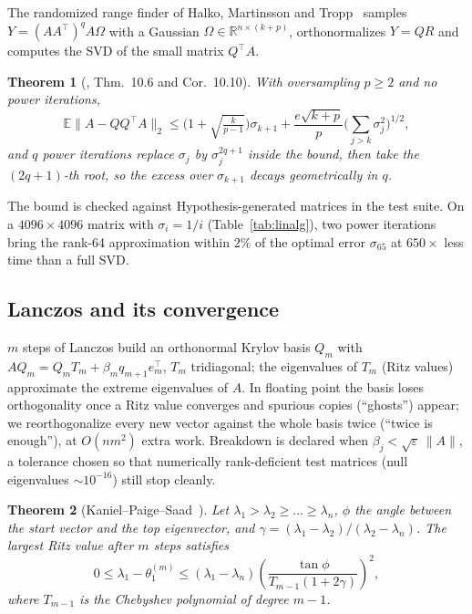 \documentclass[11pt]{article}
\newtheorem{theorem}{Theorem}
\theoremstyle{definition}
\newcommand{\R}{\mathbb{R}}
\newcommand{\E}{\mathbb{E}}
\begin{document}
The randomized range finder of Halko, Martinsson and Tropp~\cite{halko2011} samples
$Y = (AA^\top)^q A \Omega$ with a Gaussian $\Omega \in \R^{n\times(k+p)}$, orthonormalizes $Y = QR$
and computes the SVD of the small matrix $Q^\top A$.

\begin{theorem}[\cite{halko2011}, Thm.~10.6 and Cor.~10.10]
With oversampling $p \ge 2$ and no power iterations,
\[
\E \|A - QQ^\top A\|_2 \le \Big(1 + \sqrt{\tfrac{k}{p-1}}\Big)\sigma_{k+1}
+ \frac{e\sqrt{k+p}}{p}\Big(\sum_{j>k}\sigma_j^2\Big)^{1/2},
\]
and $q$ power iterations replace $\sigma_j$ by $\sigma_j^{2q+1}$ inside the bound, then take the
$(2q+1)$-th root, so the excess over $\sigma_{k+1}$ decays geometrically in $q$.
\end{theorem}

The bound is checked against Hypothesis-generated matrices in the test suite. On a
$4096 \times 4096$ matrix with $\sigma_i = 1/i$ (Table~\ref{tab:linalg}), two power iterations
bring the rank-64 approximation within $2\%$ of the optimal error $\sigma_{65}$ at
$650\times$ less time than a full SVD.

\subsection{Lanczos and its convergence}

$m$ steps of Lanczos build an orthonormal Krylov basis $Q_m$ with $AQ_m = Q_m T_m + \beta_m q_{m+1}
e_m^\top$, $T_m$ tridiagonal; the eigenvalues of $T_m$ (Ritz values) approximate the extreme
eigenvalues of $A$. In floating point the basis loses orthogonality once a Ritz value
converges and spurious copies (``ghosts'') appear; we reorthogonalize every new vector against
the whole basis twice (``twice is enough''), at $O(nm^2)$ extra work. Breakdown is declared when
$\beta_j < \sqrt{\varepsilon}\,\|A\|$, a tolerance chosen so that numerically rank-deficient test
matrices (null eigenvalues $\sim 10^{-16}$) still stop cleanly.

\begin{theorem}[Kaniel--Paige--Saad~\cite{saad2011}]
Let $\lambda_1 > \lambda_2 \ge \dots \ge \lambda_n$, $\phi$ the angle between the start vector and
the top eigenvector, and $\gamma = (\lambda_1-\lambda_2)/(\lambda_2-\lambda_n)$. The largest Ritz
value after $m$ steps satisfies
\[
0 \le \lambda_1 - \theta_1^{(m)} \le (\lambda_1 - \lambda_n)
\left(\frac{\tan\phi}{T_{m-1}(1+2\gamma)}\right)^2,
\]
where $T_{m-1}$ is the Chebyshev polynomial of degree $m-1$.
\end{theorem}
\end{document}
